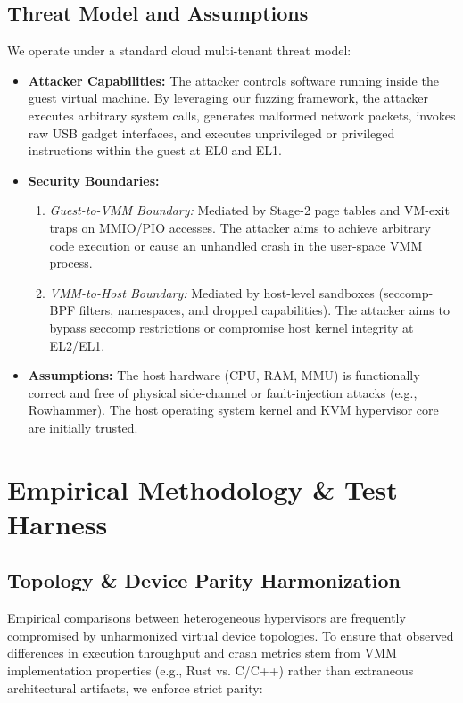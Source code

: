 \documentclass{article}
\begin{document}
\subsection{Threat Model and Assumptions}\label{sec:threat_model}
We operate under a standard cloud multi-tenant threat model:
\begin{itemize}[leftmargin=*]
    \item \textbf{Attacker Capabilities:} The attacker controls software running inside the guest virtual machine. By leveraging our fuzzing framework, the attacker executes arbitrary system calls, generates malformed network packets, invokes raw USB gadget interfaces, and executes unprivileged or privileged instructions within the guest at EL0 and EL1.
    \item \textbf{Security Boundaries:}
    \begin{enumerate}
        \item \emph{Guest-to-VMM Boundary:} Mediated by Stage-2 page tables and VM-exit traps on MMIO/PIO accesses. The attacker aims to achieve arbitrary code execution or cause an unhandled crash in the user-space VMM process.
        \item \emph{VMM-to-Host Boundary:} Mediated by host-level sandboxes (seccomp-BPF filters, namespaces, and dropped capabilities). The attacker aims to bypass seccomp restrictions or compromise host kernel integrity at EL2/EL1.
    \end{enumerate}
    \item \textbf{Assumptions:} The host hardware (CPU, RAM, MMU) is functionally correct and free of physical side-channel or fault-injection attacks (e.g., Rowhammer). The host operating system kernel and KVM hypervisor core are initially trusted.
\end{itemize}


\section{Empirical Methodology \& Test Harness}\label{sec:design}

\subsection{Topology \& Device Parity Harmonization}
Empirical comparisons between heterogeneous hypervisors are frequently compromised by unharmonized virtual device topologies. To ensure that observed differences in execution throughput and crash metrics stem from VMM implementation properties (e.g., Rust vs. C/C++) rather than extraneous architectural artifacts, we enforce strict parity:
\end{document}
